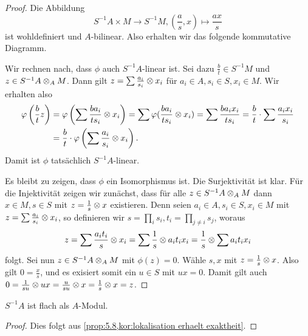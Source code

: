 \documentclass[12pt,a4paper]{scrartcl}
\theoremstyle{cplain}
\theoremstyle{cdef}
\begin{document}
\begin{proof}
	Die Abbildung \[S^{-1}A\times M\to S^{-1}M, \left(\frac as,x\right)\mapsto \frac{ax}s\]
	ist wohldefiniert und $A$-bilinear. Also erhalten wir das folgende kommutative Diagramm.
	\begin{center}
	\end{center}
	Wir rechnen nach, dass $\phi$ auch  $S^{-1}A$-linear ist. Sei dazu $\frac bt \in S^{-1}M$ und $z\in S^{-1}A\otimes_A M$. Dann gilt $z = \sum \frac {a_i}{s_i}\otimes x_i$ für $a_i\in A, s_i\in S, x_i\in M$. Wir erhalten also
	\begin{align*}
		\varphi\left(\frac{b}{t} z\right) &=\varphi\left(\sum\frac{ba_i}{ts_i}\otimes x_i \right) = \sum\varphi(\frac{ba_i}{ts_i}\otimes x_i) = \sum \frac{ba_ix_i}{ts_i} = \frac{b}{t} \cdot \sum \frac{a_ix_i}{s_i} \\
		&= \frac bt \cdot \varphi\left(\sum\frac{a_i}{s_i}\otimes x_i\right).
	\end{align*}
	Damit ist $\phi$ tatsächlich $S^{-1}A$-linear.
	
	Es bleibt zu zeigen, dass $\phi$ ein Isomorphismus ist. Die Surjektivität ist klar. Für die Injektivität zeigen wir zunächst, dass für alle $z\in S^{-1}A\otimes_AM$ dann $x\in M, s\in S$ mit $z = \frac 1s\otimes x$ existieren. Denn seien $a_i\in A, s_i\in S, x_i\in M$ mit $z = \sum\frac{a_i}{s_i}\otimes x_i$, so definieren wir $s = \prod_i s_i, t_i = \prod_{j \neq i} s_j$, woraus \[z = \sum \frac{a_it_i}{s}\otimes x_i = \sum \frac 1s \otimes a_it_ix_i = \frac{1}{s}\otimes\sum a_it_ix_i\]
	folgt. Sei nun $z\in S^{-1}A\otimes_AM$ mit $\phi(z) = 0$. Wähle $s,x$ mit $z = \frac 1s\otimes x$. Also gilt $0 = \frac xs$, und es exisiert somit ein $u\in S$ mit $ux = 0$. Damit gilt auch $0 = \frac 1{su}\otimes ux = \frac{u}{su}\otimes x = \frac{1}{s}\otimes x = z$.
\end{proof}
\begin{kor}
	$S^{-1}A$ ist flach als $A$-Modul.
\end{kor}
\begin{proof}
	Dies folgt aus \cref{prop:5.8,kor:lokalisation erhaelt exaktheit}.
\end{proof}
\end{document}
